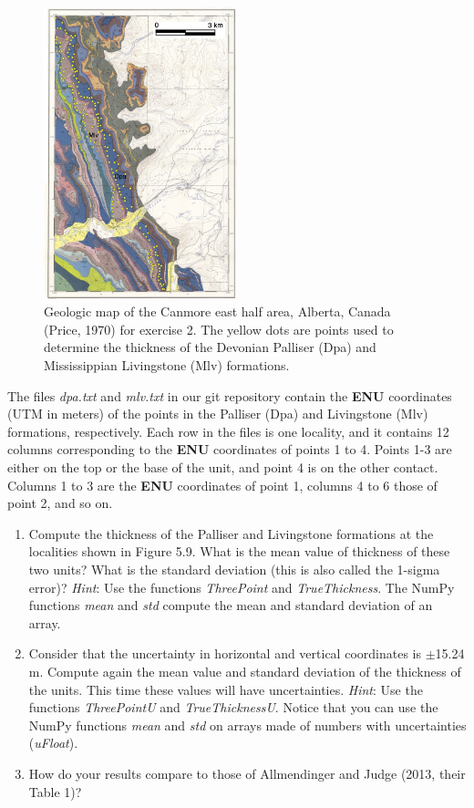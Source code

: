 \documentclass[a4paper , 12pt]{book}
\begin{document}
\begin{enumerate}
     \begin{figure}
        \caption{Geologic map of the Canmore east half area, Alberta, Canada (Price, 1970) for exercise 2. The yellow dots are points used to determine the thickness of the Devonian Palliser (Dpa) and Mississippian Livingstone (Mlv) formations.}
        \includegraphics[width=0.5\textwidth]{Figures/ch5f14.jpg}
    \end{figure}
    
    The files \textit{dpa.txt} and \textit{mlv.txt} in our git repository contain the \textbf{ENU} coordinates (UTM in meters) of the points in the Palliser (Dpa) and Livingstone (Mlv) formations, respectively. Each row in the files is one locality, and it contains 12 columns corresponding to the \textbf{ENU} coordinates of points 1 to 4. Points 1-3 are either on the top or the base of the unit, and point 4 is on the other contact. Columns 1 to 3 are the \textbf{ENU} coordinates of point 1, columns 4 to 6 those of point 2, and so on.
    
    \begin{enumerate}
        \item Compute the thickness of the Palliser and Livingstone formations at the localities shown in Figure 5.9. What is the mean value of thickness of these two units? What is the standard deviation (this is also called the 1-sigma error)? \textit{Hint}: Use the functions \textit{ThreePoint} and \textit{TrueThickness}. The NumPy functions \textit{mean} and \textit{std} compute the mean and standard deviation of an array.
        \item Consider that the uncertainty in horizontal and vertical coordinates is $\pm$15.24 m. Compute again the mean value and standard deviation of the thickness of the units. This time these values will have uncertainties. \textit{Hint}: Use the functions \textit{ThreePointU} and \textit{TrueThicknessU}. Notice that you can use the NumPy functions \textit{mean} and \textit{std} on arrays made of numbers with uncertainties (\textit{uFloat}).
        \item How do your results compare to those of Allmendinger and Judge (2013, their Table 1)?
    \end{enumerate}{}
    

\end{enumerate}
\end{document}
